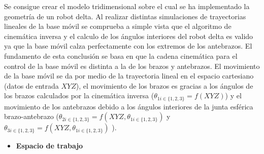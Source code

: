            Se consigue crear el modelo tridimensional sobre el cual se ha implementado la geometría de un robot delta. Al realizar distintas simulaciones de trayectorias lineales de la base móvil se comprueba a simple vista que el algoritmo de cinemática inversa y el calculo de los ángulos interiores del robot delta es valido ya que la base móvil calza perfectamente con los extremos de los antebrazos. El fundamento de esta conclusión se basa en que la cadena cinemática para el control de la base móvil es distinta a la de los brazos y antebrazos. El movimiento de la base móvil se da por medio de la trayectoria lineal en el espacio cartesiano (datos de entrada $XYZ$), el movimiento de los brazos es gracias a los ángulos de los brazos calculados por la cinemática inversa ($\theta_{1i\in \{1,2,3\}} =f(XYZ)$) y el movimiento de los antebrazos debido a los ángulos interiores de la junta esférica brazo-antebrazo ($\theta_{2i\in \{1,2,3\}} =f(XYZ,\theta_{1i\in \{1,2,3\}} ) $ y $\theta_{3i\in \{1,2,3\}} =f(XYZ,\theta_{1i\in \{1,2,3\}} ) $ ).
            
             \begin{itemize}
                 \item  \textbf{Espacio de trabajo}
             \end{itemize}
             
             
            
